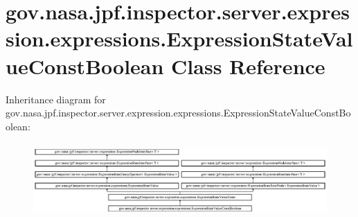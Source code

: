 \hypertarget{classgov_1_1nasa_1_1jpf_1_1inspector_1_1server_1_1expression_1_1expressions_1_1_expression_state_value_const_boolean}{}\section{gov.\+nasa.\+jpf.\+inspector.\+server.\+expression.\+expressions.\+Expression\+State\+Value\+Const\+Boolean Class Reference}
\label{classgov_1_1nasa_1_1jpf_1_1inspector_1_1server_1_1expression_1_1expressions_1_1_expression_state_value_const_boolean}
Inheritance diagram for gov.\+nasa.\+jpf.\+inspector.\+server.\+expression.\+expressions.\+Expression\+State\+Value\+Const\+Boolean\+:\begin{figure}[H]
\begin{center}
\leavevmode
\includegraphics[height=2.847458cm]{classgov_1_1nasa_1_1jpf_1_1inspector_1_1server_1_1expression_1_1expressions_1_1_expression_state_value_const_boolean}
\end{center}
\end{figure}
